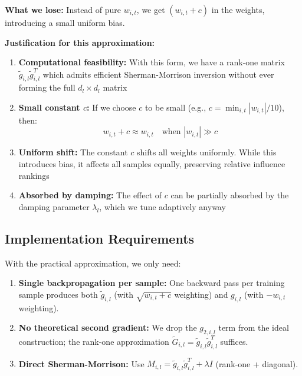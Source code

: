 \documentclass{article}
\begin{document}
\textbf{What we lose:} Instead of pure $w_{i,t}$, we get $(w_{i,t} + c)$ in the weights, introducing a small uniform bias.

\textbf{Justification for this approximation:}

\begin{enumerate}
    \item \textbf{Computational feasibility:} With this form, we have a rank-one matrix $\tilde{g}_{i,l}\tilde{g}_{i,l}^T$ which admits efficient Sherman-Morrison inversion without ever forming the full $d_l \times d_l$ matrix
    
    \item \textbf{Small constant $c$:} If we choose $c$ to be small (e.g., $c = \min_{i,t}|w_{i,t}| / 10$), then:
    \begin{equation}
    w_{i,t} + c \approx w_{i,t} \quad \text{when } |w_{i,t}| \gg c
    \end{equation}
    
    \item \textbf{Uniform shift:} The constant $c$ shifts all weights uniformly. While this introduces bias, it affects all samples equally, preserving relative influence rankings
    
    \item \textbf{Absorbed by damping:} The effect of $c$ can be partially absorbed by the damping parameter $\lambda_l$, which we tune adaptively anyway
\end{enumerate}


\subsection{Implementation Requirements}

With the practical approximation, we only need:

\begin{enumerate}
    \item \textbf{Single backpropagation per sample:} One backward pass per training sample produces both $\tilde{g}_{i,l}$ (with $\sqrt{w_{i,t}+c}$ weighting) and $g_{i,l}$ (with $-w_{i,t}$ weighting).
    \item \textbf{No theoretical second gradient:} We drop the $g_{2,i,l}$ term from the ideal construction; the rank-one approximation $\tilde{G}_{i,l} = \tilde{g}_{i,l}\tilde{g}_{i,l}^T$ suffices.
    \item \textbf{Direct Sherman-Morrison:} Use $M_{i,l} = \tilde{g}_{i,l}\tilde{g}_{i,l}^T + \lambda I$ (rank-one + diagonal).
\end{enumerate}
\end{document}
